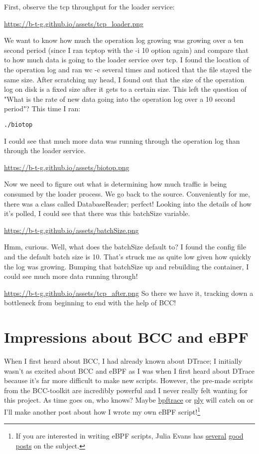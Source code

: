 \documentclass[11pt]{article}
\begin{document}
First, observe the tcp throughput for the loader service:

\url{https://b-t-g.github.io/assets/tcp\_loader.png}

We want to know how much the operation log growing was growing over a ten second period (since I ran tcptop with the -i 10 option again) and compare that to how much data is going to the
loader service over tcp. I found the location of the operation log and ran wc -c several times and noticed that the file stayed the same size. After scratching my head, I found out that the
size of the operation log on disk is a fixed size after it gets to a certain size. This left the question of "What is the rate of new data going into the operation log over a 10 second period"?
This time I ran:
\begin{verbatim}
./biotop
\end{verbatim}
I could see that much more data was running through the operation log than through the loader service.

\url{https://b-t-g.github.io/assets/biotop.png}

Now we need to figure out what is determining how much traffic is being consumed by the loader process. We go back to the source. Conveniently for me, there was a class called DatabaseReader;
perfect! Looking into the details of how it's polled, I could see that there was this batchSize variable.

\url{https://b-t-g.github.io/assets/batchSize.png}

Hmm, curious. Well, what does the batchSize default to? I found the config file and the default batch size is 10. That's struck me as quite low given how quickly the log was growing.
Bumping that batchSize up and rebuilding the container, I could see much more data running through!

\url{https://b-t-g.github.io/assets/tcp\_after.png}
So there we have it, tracking down a bottleneck from beginning to end with the help of BCC!

\section*{Impressions about BCC and eBPF}
\label{sec:org2347a43}
When I first heard about BCC, I had already known about DTrace; I initially wasn't as excited about BCC and eBPF as I was when I first heard about DTrace because it's far more difficult to make
new scripts. However, the pre-made scripts from the BCC-toolkit are incredibly powerful and I never really felt wanting for this project. As time goes on, who knows? Maybe
\href{https://github.com/ajor/bpftrace}{bpftrace} or \href{https://github.com/iovisor/ply}{ply} will catch on or I'll make another post about how I wrote my own eBPF script!\footnote{If you are interested in writing eBPF scripts, Julia Evans has \href{https://jvns.ca/blog/2018/02/24/an-ltrace-clone-using-ebpf/}{several} \href{https://jvns.ca/blog/2018/02/05/rust-bcc/}{good} \href{https://jvns.ca/blog/2018/01/31/spying-on-a-ruby-process-s-memory-allocations/}{posts} on the subject.}
\end{document}
